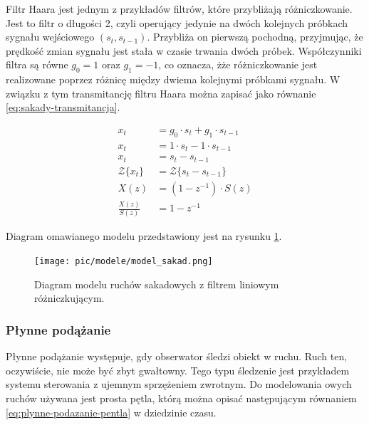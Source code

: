 \documentclass[a4paper,twoside,12pt]{book}
\begin{document}
Filtr Haara jest jednym z przykładów filtrów, które przybliżają różniczkowanie. Jest to filtr o długości 2, czyli operujący jedynie na dwóch kolejnych próbkach sygnału wejściowego $(s_t, s_{t-1})$. Przybliża on pierwszą pochodną, przyjmując, że prędkość zmian sygnału jest stała w czasie trwania dwóch próbek. Współczynniki filtra są równe $g_0 = 1$ oraz $g_1 = -1$, co oznacza, żże różniczkowanie jest realizowane poprzez różnicę między dwiema kolejnymi próbkami sygnału. W związku z tym transmitancję filtru Haara można zapisać jako równanie \ref{eq:sakady-transmitancja}.

\begin{align} %
	x_t &= g_0 \cdot s_t + g_1 \cdot s_{t-1} \nonumber \\
	x_t &= 1 \cdot s_t - 1 \cdot s_{t-1} \nonumber \\
	x_t &= s_t - s_{t-1} \nonumber \\
	\mathcal{Z}\{x_t\} &= \mathcal{Z} \{s_t - s_{t-1}\} \nonumber \\
	X(z) &= (1 - z^{-1}) \cdot S(z) \nonumber \\ %
	\frac{X(z)}{S(z)} &= 1 - z^{-1} \label{eq:sakady-transmitancja}
\end{align}   %

Diagram omawianego modelu przedstawiony jest na rysunku \ref{fig:model-sakad}.

\begin{figure}[htbp]
	\centering
	\texttt{[image: pic/modele/model\_sakad.png]}
	\caption{Diagram modelu ruchów sakadowych z filtrem liniowym różniczkującym.}
	\label{fig:model-sakad}
\end{figure}

\subsubsection{Płynne podążanie}
\label{subsubsec:plynne-podazanie}

Płynne podążanie występuje, gdy obserwator śledzi obiekt w ruchu. Ruch ten, oczywiście, nie może być zbyt gwałtowny. Tego typu śledzenie jest przykładem systemu sterowania z ujemnym sprzężeniem zwrotnym. Do modelowania owych ruchów używana jest prosta pętla, którą można opisać następującym równaniem \ref{eq:plynne-podazanie-pentla} w dziedzinie czasu.
\end{document}
